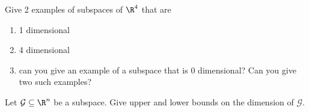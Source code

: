 \begin{exercises}
\begin{problist}
		\prob Give 2 examples of subspaces of $\R^4$ that are
		\begin{enumerate}
			\item 1 dimensional
			\item 4 dimensional
			\item can you give an example of a subspace that is 0 dimensional?
			Can you give two such examples?
		\end{enumerate}

		\prob Let $\mathcal G\subseteq \R^n$ be a subspace.
		Give upper and lower bounds on the dimension of $\mathcal G$.
	\end{problist}
\end{exercises}
